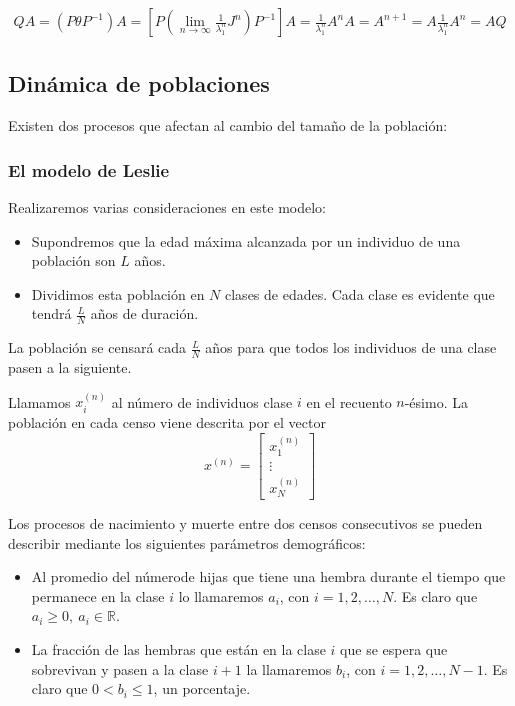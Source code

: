 \documentclass[11pt, a4paper]{article}
\makeatletter
\newif\IfInSansMode
\let\oldsf\sffamily
\renewcommand*{\sffamily}{\oldsf\mathversion{sans}\InSansModetrue}
\let\oldnorm\normalfont
\renewcommand*{\normalfont}{\oldnorm\InSansModefalse\mathversion{normal}}
\renewenvironment{proof}[1][\proofname] {\vspace{-15pt}\par\pushQED{\qed}\normalfont\topsep6\p@\@plus6\p@\relax\trivlist\item[\hskip\labelsep\it#1\@addpunct{.}]\ignorespaces}{\popQED\endtrivlist\@endpefalse}
\numberwithin{equation}{section}
\newcommand{\R}{\mathbb{R}}
\renewenvironment{proof}[1][\proofname] {\par\pushQED{\qed}\normalfont\topsep6\p@\@plus6\p@\relax\trivlist\item[\hskip\labelsep\itshape\sffamily#1\@addpunct{.}]\ignorespaces}{\popQED\endtrivlist\@endpefalse}
\theoremstyle{theorem-style}
\theoremstyle{definition-style}
\theoremstyle{remark-style}
\theoremstyle{example-style}
\makeatother
\begin{document}
\begin{proof}
\begin{itemize}
    \begin{align*}
        \label{}
        QA = (P\theta P^{-1})A = \left[ P \left( \lim_{n \to \infty} \frac{1}{\lambda^n_1}J^n \right) P^{-1} \right] A = \frac{1}{\lambda^n_1}A^nA=A^{n+1} = A \frac{1}{\lambda^n_1} A^n = AQ
    \end{align*}
    \end{itemize}
\end{proof}

    \subsection{Dinámica de poblaciones}
    \label{sub:din_mica_de_poblaciones}
    
    Existen dos procesos que afectan al cambio del tamaño de la población:


    \subsubsection{El modelo de Leslie}
    \label{ssub:el_modelo_de_leslie}

    Realizaremos varias consideraciones en este modelo: \begin{itemize}
        \item Supondremos que la edad máxima alcanzada por un individuo de una población son $L$ años.
        \item Dividimos esta población en $N$ clases de edades. Cada clase es evidente que tendrá $\frac{L}{N}$ años de duración.
    \end{itemize}

    La población se censará cada $\frac{L}{N}$ años para que todos los individuos de una clase pasen a la siguiente.

    Llamamos $x_i^{(n)}$ al número de individuos clase $i$ en el recuento $n$-ésimo.
    La población en cada censo viene descrita por el vector $$x^{(n)} = \begin{bmatrix}
        x_1^{(n)} \\
        \vdots \\
        x_N^{(n)}
    \end{bmatrix}$$

    Los procesos de nacimiento y muerte entre dos censos consecutivos se pueden describir mediante los siguientes parámetros demográficos:
    \begin{itemize}
        \item Al promedio del númerode hijas que tiene una hembra durante el tiempo que permanece en la clase $i$ lo llamaremos $a_i$, con $i = 1, 2, \hdots, N$. Es claro que $a_i \geq 0, \ a_i \in \R$.
        \item La fracción de las hembras que están en la clase $i$ que se espera que sobrevivan y pasen a la clase $i+1$ la llamaremos $b_i$, con $i = 1, 2, \hdots, N-1$. Es claro que $0 < b_i \leq 1$, un porcentaje.
    \end{itemize}
\end{document}
